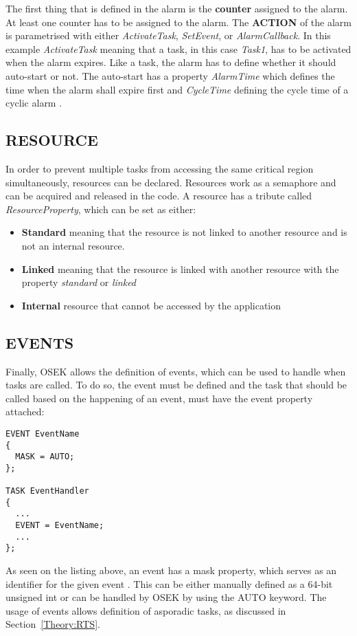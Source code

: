 The first thing that is defined in the alarm is the \textbf{counter} assigned to the alarm.
At least one counter has to be assigned to the alarm.
The \textbf{ACTION} of the alarm is parametrised with either \textit{ActivateTask}, \textit{SetEvent}, or \textit{AlarmCallback}\cite{irisa25}.
In this example \textit{ActivateTask} meaning that a task, in this case \textit{Task1}, has to be activated when the alarm expires. 
Like a task, the alarm has to define whether it should auto-start or not.
The auto-start has a property \textit{AlarmTime} which defines the time when the alarm shall expire first and \textit{CycleTime} defining the cycle time of a cyclic alarm \cite{irisa25}.

\subsection{RESOURCE}
In order to prevent multiple tasks from accessing the same critical region simultaneously, resources can be declared.
Resources work as a semaphore and can be acquired and released in the code.
A resource has a tribute called \textit{ResourceProperty}, which can be set as either:
\begin{itemize}
\item \textbf{Standard} meaning that the resource is not linked to another resource and is not an internal resource.
\item \textbf{Linked} meaning that the resource is linked with another resource with the property \textit{standard} or \textit{linked}
\item \textbf{Internal} resource that cannot be accessed by the application \cite{irisa25}
\end{itemize}

\subsection{EVENTS}
Finally, OSEK allows the definition of events, which can be used to handle when tasks are called.
To do so, the event must be defined and the task that should be called based on the happening of an event, must have the event property attached:
\begin{lstlisting}
EVENT EventName
{
  MASK = AUTO;
};

TASK EventHandler
{
  ...
  EVENT = EventName;
  ...
};
\end{lstlisting}
As seen on the listing above, an event has a mask property, which serves as an identifier for the given event \cite{oil25}.
This can be either manually defined as a 64-bit unsigned int or can be handled by OSEK by using the AUTO keyword.
The usage of events allows definition of asporadic tasks, as discussed in Section~\ref{Theory:RTS}.
